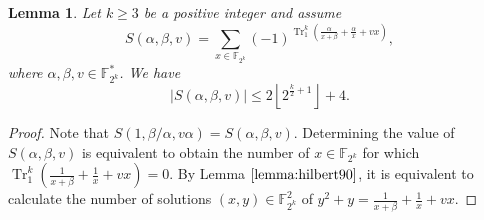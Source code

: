 \documentclass{article}
\newcommand{\F}{\mathbb{F}}
\newcommand{\0}{\textbf{0}}
\newcommand{\1}{\textbf{1}}
\newcommand{\TRACE}{\operatorname{Tr}_1^k}
\theoremstyle{plain}
\newtheorem{lemma}{Lemma}
\begin{document}
    \begin{lemma}\label{lemma:charactersums}
        Let $k\ge 3$ be a positive integer and assume
        \[S(\alpha,\beta,v)=\sum_{x\in\F_{2^k}}(-1)^{\TRACE\left( \frac{\alpha}{x+\beta}+\frac{\alpha}{x}+vx \right)},\]
        where $\alpha,\beta,v\in\F_{2^k}^*$.
        We have
        \[\left\lvert S(\alpha,\beta,v)\right\rvert\le 2\left\lfloor 2^{\frac{k}{2}+1}\right\rfloor+4 .\]
    \end{lemma}
    \begin{proof}
        Note that $S(1,\beta/\alpha,v\alpha)=S(\alpha,\beta,v)$.
        Determining the value of $S(\alpha,\beta,v)$ is equivalent to obtain the number of $x\in\F_{2^k}$
        for which $\TRACE\left( \frac{1}{x+\beta}+\frac{1}{x}+vx \right)=0$.
        By Lemma $\ref{lemma:hilbert90}$, it is equivalent to calculate the number of solutions $(x,y)\in\F_{2^k}^2$ of $y^2+y=\frac{1}{x+\beta}+\frac{1}{x}+vx$.


\end{proof}
\end{document}
